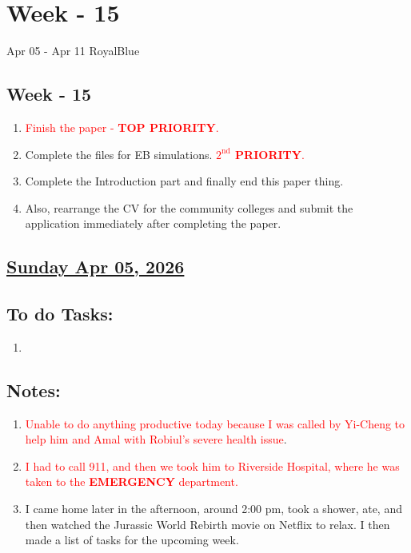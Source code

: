 \section{Week - 15}
\begin{physicsmodule}{Apr 05 - Apr 11 }{RoyalBlue}
  \begin{lawbox}
    \subsection*{ Week - 15}
    \begin{enumerate}
    \item \textcolor{Red}{Finish the paper - \textbf{TOP PRIORITY}.}
    \item Complete the files for EB simulations. \textcolor{Red}{\textbf{$\mathrm{2^{nd}}$ PRIORITY}.}
    \item Complete the Introduction part and finally end this paper thing.
    \item Also, rearrange the CV for the community colleges and submit the application immediately after completing the paper.
\end{enumerate}
  \end{lawbox}
\end{physicsmodule}
\subsection*{\underline{Sunday Apr 05, 2026}}
\subsection*{To do Tasks:}
\begin{enumerate}
    \item 
\end{enumerate}
\subsection*{Notes:}
\begin{enumerate}
    \item \textcolor{red} {Unable to do anything productive today because I was called by Yi-Cheng to help him and Amal with Robiul's severe health issue}. 
    \item \textcolor{red}{I had to call 911, and then we took him to Riverside Hospital, where he was taken to the {\textbf{EMERGENCY}} department.}
    \item I came home later in the afternoon, around 2:00 pm, took a shower, ate, and then watched the Jurassic World Rebirth movie on Netflix to relax. I then made a list of tasks for the upcoming week.
\end{enumerate}
